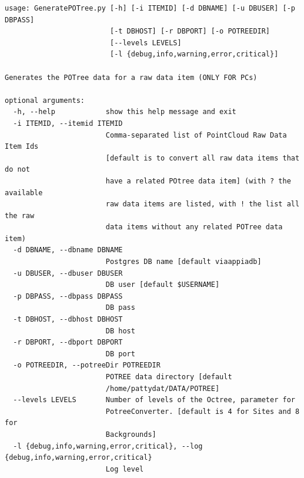 \begin{Verbatim}[fontfamily=courier,commandchars=\\\{\},fontsize=\footnotesize]
usage: GeneratePOTree.py [-h] [-i ITEMID] [-d DBNAME] [-u DBUSER] [-p DBPASS]
                         [-t DBHOST] [-r DBPORT] [-o POTREEDIR]
                         [--levels LEVELS]
                         [-l {debug,info,warning,error,critical}]

Generates the POTree data for a raw data item (ONLY FOR PCs)

optional arguments:
  -h, --help            show this help message and exit
  -i ITEMID, --itemid ITEMID
                        Comma-separated list of PointCloud Raw Data Item Ids
                        [default is to convert all raw data items that do not
                        have a related POtree data item] (with ? the available
                        raw data items are listed, with ! the list all the raw
                        data items without any related POTree data item)
  -d DBNAME, --dbname DBNAME
                        Postgres DB name [default viaappiadb]
  -u DBUSER, --dbuser DBUSER
                        DB user [default $USERNAME]
  -p DBPASS, --dbpass DBPASS
                        DB pass
  -t DBHOST, --dbhost DBHOST
                        DB host
  -r DBPORT, --dbport DBPORT
                        DB port
  -o POTREEDIR, --potreeDir POTREEDIR
                        POTREE data directory [default
                        /home/pattydat/DATA/POTREE]
  --levels LEVELS       Number of levels of the Octree, parameter for
                        PotreeConverter. [default is 4 for Sites and 8 for
                        Backgrounds]
  -l {debug,info,warning,error,critical}, --log {debug,info,warning,error,critical}
                        Log level
\end{Verbatim}
